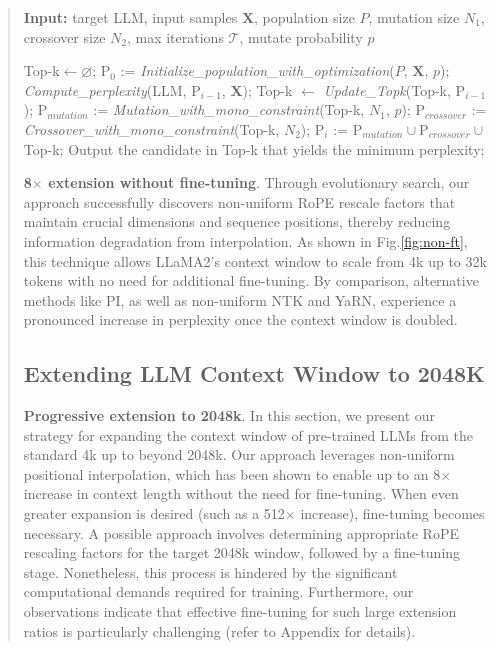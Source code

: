 \begin{abstract}
\begin{algorithm}[t]
	\small
	\caption{The search algorithm}
	\textbf{Input:} target LLM, input samples $\mathbf{X}$, population size $P$, mutation size $N_1$, crossover size $N_2$, max iterations $\mathcal{T}$, mutate probability $p$\\

	\begin{algorithmic}[1]
		\label{alg:search}
		\STATE Top-k$\leftarrow \varnothing$;	
		\STATE $\text{P}_0$ := \textit{Initialize\_population\_with\_optimization}($P$, $\mathbf{X}$, $p$); 
		\STATE \textit{Compute\_perplexity}(LLM, $\text{P}_{i-1}$, $\mathbf{X}$);
		\STATE Top-k $\gets$ \textit{Update\_Topk}(Top-k, $\text{P}_{i-1}$);
		\STATE $\text{P}_{mutation}$ := \textit{Mutation\_with\_mono\_constraint}(Top-k, $N_1$, $p$); 
		\STATE $\text{P}_{crossover}$ := \textit{Crossover\_with\_mono\_constraint}(Top-k, $N_2$);
		\STATE $\text{P}_i$ := $\text{P}_{mutation} \cup \text{P}_{crossover} \cup$ Top-k;
		\ENDFOR
		\STATE Output the candidate in Top-k that yields the minimum perplexity;
	\end{algorithmic}
\end{algorithm}

\textbf{8$\times$ extension without fine-tuning}. Through evolutionary search, our approach successfully discovers non-uniform RoPE rescale factors that maintain crucial dimensions and sequence positions, thereby reducing information degradation from interpolation. As shown in Fig.\ref{fig:non-ft}, this technique allows LLaMA2's context window to scale from 4k up to 32k tokens with no need for additional fine-tuning. By comparison, alternative methods like PI, as well as non-uniform NTK and YaRN, experience a pronounced increase in perplexity once the context window is doubled.

\subsection{Extending LLM Context Window to 2048K}
\label{sec:extendto2048k}

\textbf{Progressive extension to 2048k}. In this section, we present our strategy for expanding the context window of pre-trained LLMs from the standard 4k up to beyond 2048k. Our approach leverages non-uniform positional interpolation, which has been shown to enable up to an 8$\times$ increase in context length without the need for fine-tuning. When even greater expansion is desired (such as a 512$\times$ increase), fine-tuning becomes necessary. A possible approach involves determining appropriate RoPE rescaling factors for the target 2048k window, followed by a fine-tuning stage. Nonetheless, this process is hindered by the significant computational demands required for training. Furthermore, our observations indicate that effective fine-tuning for such large extension ratios is particularly challenging (refer to Appendix for details).


\end{abstract}
